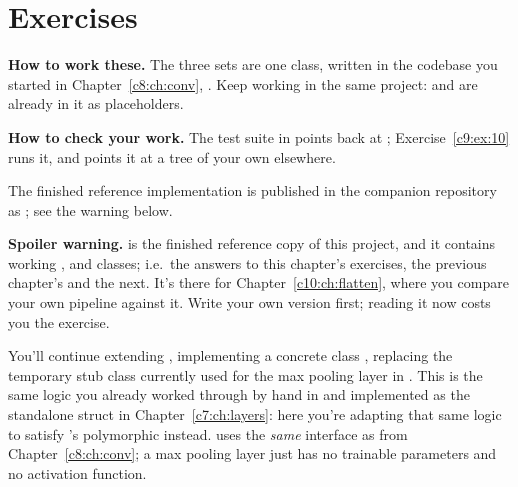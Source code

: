 
\section{Exercises}
\label{c9:sec:exercises}\label{c9:app:a}

\begin{aside}
\textbf{How to work these.} The three sets are one class, written in the  codebase
you started in Chapter~\ref{c8:ch:conv}, . Keep working in the same
project:  and  are already in it as placeholders.

\textbf{How to check your work.} The test suite in 
points back at ; Exercise~\ref{c9:ex:10} runs it, and 
points it at a tree of your own elsewhere.

The finished reference implementation is published in the companion repository as
; see the warning below.
\end{aside}

\begin{warning}
\textbf{Spoiler warning.}  is the finished reference copy of this
project, and it contains working ,  and  classes; i.e.\ the
answers to this chapter's exercises, the previous chapter's and the next. It's there for
Chapter~\ref{c10:ch:flatten}, where you compare your own pipeline against it. Write your own
version first; reading it now costs you the exercise.
\end{warning}

\label{c9:set:1}
You'll continue extending , implementing a concrete class , replacing
the temporary stub class  currently used for the max pooling layer
in . This is the same logic you already worked through by hand in
 and implemented as the standalone struct  in
Chapter~\ref{c7:ch:layers}: here you're adapting that same logic to satisfy 's
polymorphic  instead.  uses the \emph{same} interface as
 from Chapter~\ref{c8:ch:conv}; a max pooling layer just has no trainable parameters
and no activation function.

